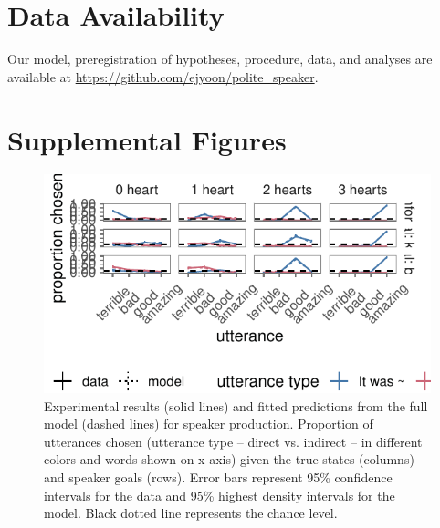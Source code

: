 \documentclass[oneside]{report}
\begin{document}
\section{Data Availability}\label{data-availability}

Our model, preregistration of hypotheses, procedure, data, and analyses
are available at \url{https://github.com/ejyoon/polite_speaker}.

\section{Supplemental Figures}\label{supplemental-figures}
\begin{figure}[!h]

{\centering \includegraphics[width=\textwidth]{erica_yoon_dissertation_files/figure-latex/utterance-1} 

}

\caption[Full comparison between experimental results and model predictions.]{Experimental results (solid lines) and fitted predictions from the full model (dashed lines) for speaker production. Proportion of utterances chosen (utterance type – direct vs. indirect – in different colors and words shown on x-axis) given the true states (columns) and speaker goals (rows). Error bars represent 95\% confidence intervals for the data and 95\% highest density intervals for the model. Black dotted line represents the chance level.}\label{fig:utterance}
\end{figure}
\end{document}
